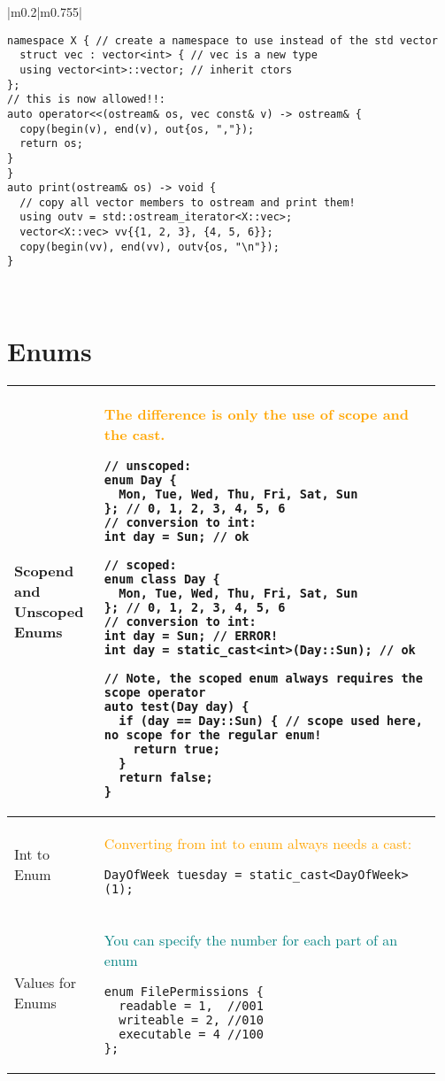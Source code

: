 \documentclass[main.tex,fontsize=8pt,paper=a4,paper=portrait,DIV=calc,]{scrartcl}
\begin{document}
\begin{table}[ht!]
\begin{tabular}{|m{0.2\linewidth}|m{0.755\linewidth}|}
\begin{lstlisting}
namespace X { // create a namespace to use instead of the std vector
  struct vec : vector<int> { // vec is a new type
  using vector<int>::vector; // inherit ctors
};
// this is now allowed!!:
auto operator<<(ostream& os, vec const& v) -> ostream& { 
  copy(begin(v), end(v), out{os, ","});
  return os;
}
}
auto print(ostream& os) -> void {
  // copy all vector members to ostream and print them!
  using outv = std::ostream_iterator<X::vec>;
  vector<X::vec> vv{{1, 2, 3}, {4, 5, 6}};
  copy(begin(vv), end(vv), outv{os, "\n"});
}
\end{lstlisting}\\
\hline
\end{tabular}
\section{Enums}
\begin{tabular}{|m{0.2\linewidth}|m{0.755\linewidth}|}
\hline
Scopend and Unscoped Enums &
\textcolor{orange}{The difference is only the use of scope and the cast.}\newline
\begin{lstlisting}
// unscoped:
enum Day { 
  Mon, Tue, Wed, Thu, Fri, Sat, Sun
}; // 0, 1, 2, 3, 4, 5, 6
// conversion to int:
int day = Sun; // ok

// scoped:
enum class Day { 
  Mon, Tue, Wed, Thu, Fri, Sat, Sun
}; // 0, 1, 2, 3, 4, 5, 6
// conversion to int:
int day = Sun; // ERROR!
int day = static_cast<int>(Day::Sun); // ok

// Note, the scoped enum always requires the scope operator
auto test(Day day) {
  if (day == Day::Sun) { // scope used here, no scope for the regular enum!
    return true;
  }
  return false;
}
\end{lstlisting}\\
\hline
Int to Enum & 
\textcolor{orange}{Converting from int to enum always needs a cast:}\newline
\begin{lstlisting}
DayOfWeek tuesday = static_cast<DayOfWeek>(1);
\end{lstlisting}\\
\hline
Values for Enums &
\textcolor{teal}{You can specify the number for each part of an enum}\newline
\begin{lstlisting}
enum FilePermissions {
  readable = 1,  //001
  writeable = 2, //010
  executable = 4 //100
};
\end{lstlisting}\\
\hline

\hline

\hline

\hline

\hline
\end{tabular}
\end{table}
\end{document}
